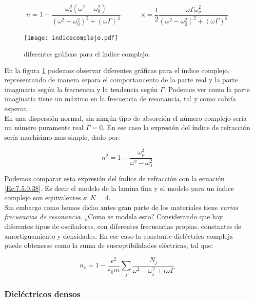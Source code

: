 \documentclass[12pt]{article}
\newcommand{\tquad}{\quad \quad \quad}
\numberwithin{equation}{section}
\numberwithin{figure}{section}
\begin{document}
\begin{equation}
n = 1 - \dfrac{\omega_p^2 (\omega^2-\omega_0^2)}{(\omega^2-\omega_0^2)^2 + (\omega \Gamma)^2} \tquad \kappa = \dfrac{1}{2} \dfrac{\omega \Gamma \omega_p^2}{(\omega^2 - \omega_0^2)^2 + (\omega \Gamma)^2}
\end{equation}



\begin{figure}[h!] \centering
\texttt{[image: indicecomplejo.pdf]}
\caption{diferentes gráficas para el índice complejo.}
\label{Fig:8.1.01}
\end{figure}


En la figura \ref{Fig:8.1.01} podemos observar diferentes gráficas para el índice complejo, representando de manera separa el comportamiento de la parte real y la parte imaginaria según la frecuencia y la tendencia según $\Gamma$. Podemos ver como la parte imaginaria tiene un máximo en la frecuencia de resonancia, tal y como cabría esperar. \\

En una dispersión normal, sin ningún tipo de absorción el número complejo sería un número puramente real $\Gamma=0$. En ese caso la expresión del índice de refracción sería muchísimo mas simple, dado por:

\begin{equation}
n^2 = 1 -  \dfrac{\omega_p^2}{\omega^2-\omega^2_0}
\end{equation}

Podemos comparar esta expresión del índice de refracción con la ecuación \ref{Ec:7.5.0.38}. Es decir el modelo de la lamina fina y el modelo para un índice complejo son equivalentes si $K=4$. \\

Sin embargo como hemos dicho antes gran parte de los materiales tiene \textit{varias frecuencias de resonancia}. ¿Como se modela esto? Considerando que hay diferentes tipos de osciladores, con diferentes frecuencias propias, constantes de amortiguamiento y densidades. En ese caso la constante  dieléctrica compleja puede obtenerse como la suma de susceptibilidades eléctricas, tal que:

\begin{equation}
n_c = 1 - \dfrac{e^2}{\varepsilon_0 m} \sum_j \dfrac{N_j}{\omega^2 - \omega^2_j + i \omega \Gamma}
\end{equation}

\subsubsection{Dieléctricos densos}
\end{document}
